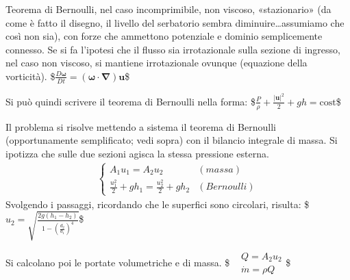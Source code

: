 \documentclass[letterpaper,10pt,italian]{jupyterBook}
\begin{document}
\sphinxAtStartPar
Teorema di Bernoulli, nel caso incomprimibile, non viscoso,
«stazionario» (da come è fatto il disegno, il livello del serbatorio
sembra diminuire…assumiamo che così non sia), con forze che ammettono
potenziale e dominio semplicemente connesso. Se si fa l’ipotesi che il
flusso sia irrotazionale sulla sezione di ingresso, nel caso non
viscoso, si mantiene irrotazionale ovunque (equazione della vorticità).
\$\(\frac{D \bm{\omega}}{Dt} = (\bm{\omega} \cdot \bm{\nabla}) \bm{u}\)\$

\sphinxAtStartPar
Si può quindi scrivere il teorema di Bernoulli nella forma:
\$\(\frac{P}{\rho} + \frac{|\bm{u}|^2}{2} + gh = \text{cost}\)\$

\sphinxAtStartPar
Il problema si risolve mettendo a sistema il teorema di Bernoulli
(opportunamente semplificato; vedi sopra) con il bilancio integrale di
massa. Si ipotizza che sulle due sezioni agisca la stessa pressione
esterna.
\begin{equation*}
\begin{split}\begin{cases}
  A_1 u_1 = A_2 u_2 & (massa) \\
  \frac{u_1^2}{2} + g h_1 = \frac{u_2^2}{2} + g h_2 & (Bernoulli)
\end{cases}\end{split}
\end{equation*}
\sphinxAtStartPar
Svolgendo i passaggi, ricordando che le superfici sono circolari,
risulta:
\$\(u_2 = \sqrt{\frac{2 g (h_1-h_2)}{1-\displaystyle\left(\frac{d_2}{d_1}\right)^4}}\)\$

\sphinxAtStartPar
Si calcolano poi le portate volumetriche e di massa. \$\(\begin{aligned}
  & Q = A_2 u_2 \\
  & \dot{m} = \rho Q
\end{aligned}\)\$

\sphinxstepscope
\end{document}

